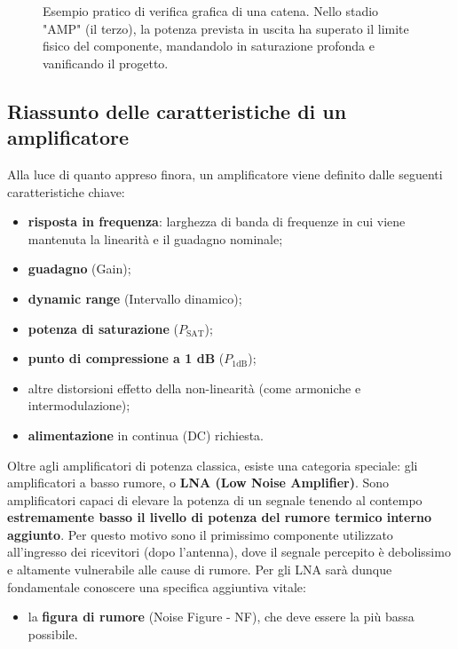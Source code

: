 \documentclass[openany,a4paper,12pt]{book}
\begin{document}
\begin{figure}[H]
{%
    }
    \caption*{Esempio pratico di verifica grafica di una catena. Nello stadio "AMP" (il terzo), la potenza prevista in uscita ha superato il limite fisico del componente, mandandolo in saturazione profonda e vanificando il progetto.}
\end{figure}

\subsection*{Riassunto delle caratteristiche di un amplificatore}

Alla luce di quanto appreso finora, un amplificatore viene definito dalle seguenti caratteristiche chiave:
\begin{itemize}[label=\textcolor{PoliBlue}{\textbullet}]
    \item \textbf{risposta in frequenza}: larghezza di banda di frequenze in cui viene mantenuta la linearità e il guadagno nominale;
    \item \textbf{guadagno} (Gain);
    \item \textbf{dynamic range} (Intervallo dinamico);
    \item \textbf{potenza di saturazione} ($P_{\text{SAT}}$);
    \item \textbf{punto di compressione a 1 dB} ($P_{1\text{dB}}$);
    \item altre distorsioni effetto della non-linearità (come armoniche e intermodulazione);
    \item \textbf{alimentazione} in continua (DC) richiesta.
\end{itemize}

Oltre agli amplificatori di potenza classica, esiste una categoria speciale: gli amplificatori a basso rumore, o \textbf{LNA (Low Noise Amplifier)}. 
Sono amplificatori capaci di elevare la potenza di un segnale tenendo al contempo \textbf{estremamente basso il livello di potenza del rumore termico interno aggiunto}. Per questo motivo sono il primissimo componente utilizzato all'ingresso dei ricevitori (dopo l'antenna), dove il segnale percepito è debolissimo e altamente vulnerabile alle cause di rumore. 
Per gli LNA sarà dunque fondamentale conoscere una specifica aggiuntiva vitale:
\begin{itemize}[label=\textcolor{ForestGreen}{\textbullet}]
    \item la \textbf{figura di rumore} (Noise Figure - NF), che deve essere la più bassa possibile.
\end{itemize}
\end{document}
